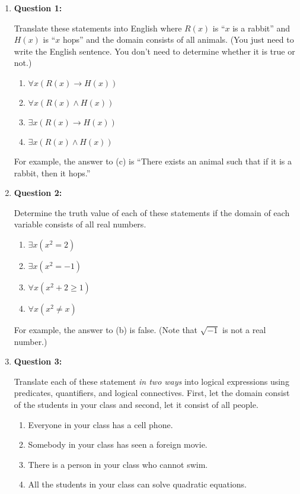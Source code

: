\documentclass[11pt]{article}
\begin{document}
\begin{enumerate}

\item
\textbf{Question 1:}

Translate these statements into English where $R(x)$ is ``$x$ is a rabbit'' and $H(x)$ is ``$x$ hops'' and the domain consists of all animals. (You just need to write the English sentence. You don't need to determine whether it is true or not.)

\begin{enumerate}[label=(\alph*)]
\item $\forall x (R(x) \rightarrow H(x))$
\item $\forall x (R(x) \land H(x))$
\item $\exists x (R(x) \rightarrow H(x))$
\item $\exists x (R(x) \land H(x))$
\end{enumerate}

For example, the answer to (c) is ``There exists an animal such that if it is a rabbit, then it hops.''

\item
\textbf{Question 2:}

Determine the truth value of each of these statements if the domain of each variable consists of all real numbers.
\begin{enumerate}[label=(\alph*)]
\item $\exists x (x^2 = 2)$
\item $\exists x (x^2 = -1)$
\item $\forall x (x^2 + 2 \geq 1)$
\item $\forall x (x^2 \neq x)$
\end{enumerate}

For example, the answer to (b) is false. (Note that $\sqrt{-1}$ is not a real number.)

\item
\textbf{Question 3:}

Translate each of these statement \emph{in two ways} into logical expressions using predicates, quantifiers, and logical connectives. First, let the domain consist of the students in your class and second, let it consist of all people.

\begin{enumerate}[label=(\alph*)]
\item Everyone in your class has a cell phone.
\item Somebody in your class has seen a foreign movie.
\item There is a person in your class who cannot swim.
\item All the students in your class can solve quadratic equations.
\end{enumerate}


\end{enumerate}
\end{document}

